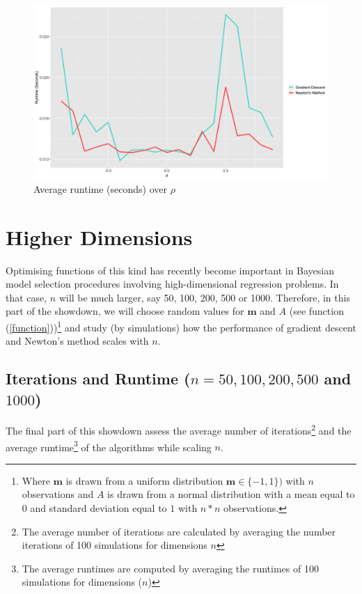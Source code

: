 \documentclass[12pt, authoryear]{elsarticle}
\begin{document}
\begin{figure}[H]
	\centering
	\includegraphics[clip, angle=0, width=13cm]{images/convergence.png}
	\caption{Average runtime (seconds) over $\rho$}
	\label{fig:convergence}
\end{figure}


\section{Higher Dimensions}  \label{sec2}

Optimising functions of this kind has recently become important in Bayesian model selection procedures involving high-dimensional regression problems. In that case, $n$ will be much larger, say 50, 100, 200, 500 or 1000. Therefore, in this part of the showdown, we will choose random values for $\boldsymbol{m}$ and $A$ (see function (\ref{function}))\footnote{Where $\boldsymbol{m}$ is drawn from a uniform distribution $\boldsymbol{m} \in \{-1, 1\})$ with $n$ observations and $A$ is drawn from a normal distribution with a mean equal to $0$ and standard deviation equal to $1$ with $n*n$ observations.} and study (by simulations) how the performance of gradient descent and Newton's method scales with $n$.

\subsection{Iterations and Runtime ($n=50, 100, 200, 500$ and $1000$)}

The final part of this showdown assess the average number of iterations\footnote{The average number of iterations are calculated by averaging the number iterations of 100 simulations for dimensions $n$} and the average runtime\footnote{The average runtimes are computed by averaging the runtimes of 100 simulations for dimensions ($n$)} of the algorithms while scaling $n$.
\end{document}
